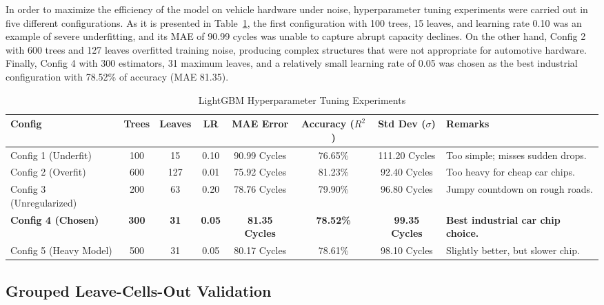 \documentclass[pdflatex,sn-mathphys-num]{sn-jnl}%
\theoremstyle{thmstyleone}%
\theoremstyle{thmstyletwo}%
\theoremstyle{thmstylethree}%
\begin{document}
In order to maximize the efficiency of the model on vehicle hardware under noise, hyperparameter tuning experiments were carried out in five different configurations. As it is presented in Table~\ref{tab:hyperparameters}, the first configuration with 100 trees, 15 leaves, and learning rate 0.10 was an example of severe underfitting, and its MAE of 90.99 cycles was unable to capture abrupt capacity declines. On the other hand, Config 2 with 600 trees and 127 leaves overfitted training noise, producing complex structures that were not appropriate for automotive hardware. Finally, Config 4 with 300 estimators, 31 maximum leaves, and a relatively small learning rate of 0.05 was chosen as the best industrial configuration with 78.52\% of accuracy (MAE 81.35).

\begin{table}[h!]
\centering
\caption{LightGBM Hyperparameter Tuning Experiments}\label{tab:hyperparameters}
\small
\begin{tabular}{@{}l c c c c c c p{2.4cm}@{}}
\toprule
\textbf{Config} & \textbf{Trees} & \textbf{Leaves} & \textbf{LR} & \textbf{MAE Error} & \textbf{Accuracy ($R^2$)} & \textbf{Std Dev ($\sigma$)} & \textbf{Remarks} \\
\midrule
Config 1 (Underfit) & 100 & 15 & 0.10 & 90.99 Cycles & 76.65\% & 111.20 Cycles & Too simple; misses sudden drops. \\[1ex]
Config 2 (Overfit) & 600 & 127 & 0.01 & 75.92 Cycles & 81.23\% & 92.40 Cycles & Too heavy for cheap car chips. \\[1ex]
Config 3 (Unregularized) & 200 & 63 & 0.20 & 78.76 Cycles & 79.90\% & 96.80 Cycles & Jumpy countdown on rough roads. \\[1ex]
\textbf{Config 4 (Chosen)} & \textbf{300} & \textbf{31} & \textbf{0.05} & \textbf{81.35 Cycles} & \textbf{78.52\%} & \textbf{99.35 Cycles} & \textbf{Best industrial car chip choice.} \\[1ex]
Config 5 (Heavy Model) & 500 & 31 & 0.05 & 80.17 Cycles & 78.61\% & 98.10 Cycles & Slightly better, but slower chip. \\
\bottomrule
\end{tabular}
\end{table}

\clearpage

\subsection{Grouped Leave-Cells-Out Validation}\label{subsec:validation}
\end{document}

